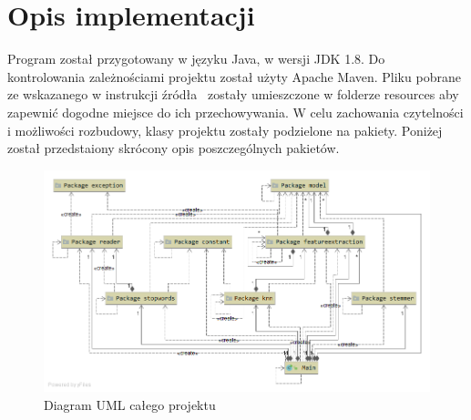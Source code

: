 \documentclass{classrep}
\begin{document}
    \section{Opis implementacji} {
        Program został przygotowany w języku Java, w wersji JDK 1.8. Do kontrolowania zależnościami
        projektu został użyty Apache Maven. Pliku pobrane ze wskazanego w instrukcji źródła~\cite{data}
        zostały umieszczone w folderze resources aby zapewnić dogodne miejsce do ich przechowywania.
        W celu zachowania czytelności i możliwości rozbudowy, klasy projektu zostały podzielone na
        pakiety. Poniżej został przedstaiony skrócony opis poszczególnych pakietów.

        \begin{figure}[!htbp]
            \centering
            \includegraphics[width=\textwidth]{img/uml/wholeapp.png}
            \caption{Diagram UML całego projektu}
        \end{figure}
        \FloatBarrier

}
\end{document}
